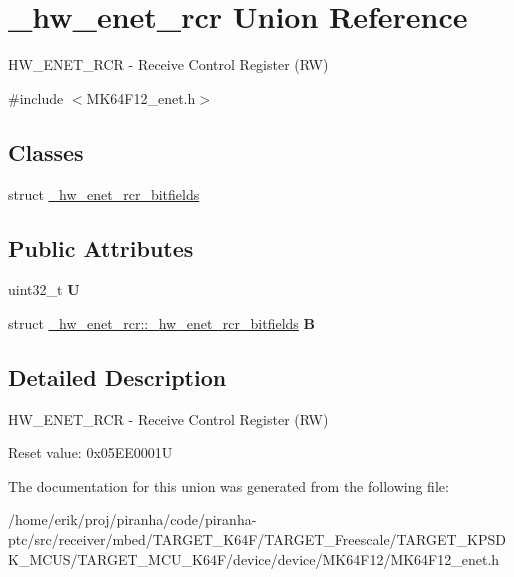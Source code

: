 \hypertarget{union__hw__enet__rcr}{}\section{\+\_\+hw\+\_\+enet\+\_\+rcr Union Reference}
\label{union__hw__enet__rcr}


H\+W\+\_\+\+E\+N\+E\+T\+\_\+\+R\+CR -\/ Receive Control Register (RW)  




{\ttfamily \#include $<$M\+K64\+F12\+\_\+enet.\+h$>$}

\subsection*{Classes}
\begin{DoxyCompactItemize}
\item 
struct \hyperlink{struct__hw__enet__rcr_1_1__hw__enet__rcr__bitfields}{\+\_\+hw\+\_\+enet\+\_\+rcr\+\_\+bitfields}
\end{DoxyCompactItemize}
\subsection*{Public Attributes}
\begin{DoxyCompactItemize}
\item 
uint32\+\_\+t {\bfseries U}\hypertarget{union__hw__enet__rcr_a9c96e6a6a224358d93c72aa0000f9494}{}\label{union__hw__enet__rcr_a9c96e6a6a224358d93c72aa0000f9494}

\item 
struct \hyperlink{struct__hw__enet__rcr_1_1__hw__enet__rcr__bitfields}{\+\_\+hw\+\_\+enet\+\_\+rcr\+::\+\_\+hw\+\_\+enet\+\_\+rcr\+\_\+bitfields} {\bfseries B}\hypertarget{union__hw__enet__rcr_a4ca92d555668bd4ca7534f27f2739e72}{}\label{union__hw__enet__rcr_a4ca92d555668bd4ca7534f27f2739e72}

\end{DoxyCompactItemize}


\subsection{Detailed Description}
H\+W\+\_\+\+E\+N\+E\+T\+\_\+\+R\+CR -\/ Receive Control Register (RW) 

Reset value\+: 0x05\+E\+E0001U 

The documentation for this union was generated from the following file\+:\begin{DoxyCompactItemize}
\item 
/home/erik/proj/piranha/code/piranha-\/ptc/src/receiver/mbed/\+T\+A\+R\+G\+E\+T\+\_\+\+K64\+F/\+T\+A\+R\+G\+E\+T\+\_\+\+Freescale/\+T\+A\+R\+G\+E\+T\+\_\+\+K\+P\+S\+D\+K\+\_\+\+M\+C\+U\+S/\+T\+A\+R\+G\+E\+T\+\_\+\+M\+C\+U\+\_\+\+K64\+F/device/device/\+M\+K64\+F12/M\+K64\+F12\+\_\+enet.\+h\end{DoxyCompactItemize}

